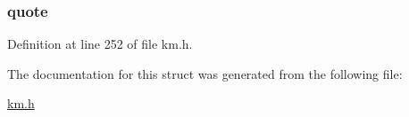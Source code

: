 \subsubsection[{\texorpdfstring{quote}{quote}}]{ quote}\hypertarget{struct_k_1_1m_pair_abb05d77de0b838cdc580fe5759070aad}{}\label{struct_k_1_1m_pair_abb05d77de0b838cdc580fe5759070aad}


Definition at line 252 of file km.\+h.



The documentation for this struct was generated from the following file\+:\begin{DoxyCompactItemize}
\item 
\hyperlink{km_8h}{km.\+h}\end{DoxyCompactItemize}
